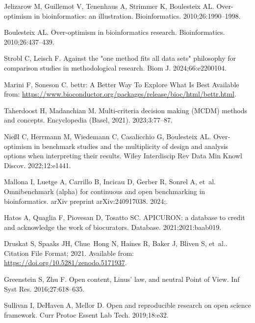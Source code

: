 \documentclass[11pt]{article}
\begin{document}
\begin{thebibliography}{10}
Jelizarow M, Guillemot V, Tenenhaus A, Strimmer K, Boulesteix AL.
\newblock Over-optimism in bioinformatics: an illustration.
\newblock Bioinformatics. 2010;26:1990--1998.

Boulesteix AL.
\newblock Over-optimism in bioinformatics research.
\newblock Bioinformatics. 2010;26:437--439.

Strobl C, Leisch F.
\newblock Against the "one method fits all data sets" philosophy for comparison
  studies in methodological research.
\newblock Biom J. 2024;66:e2200104.

Marini F, Soneson C. 
\newblock bettr: A Better Way To Explore What Is Best
\newblock Available from: \url{https://www.bioconductor.org/packages/release/bioc/html/bettr.html}.

Taherdoost H, Madanchian M.
\newblock Multi-criteria decision making ({MCDM}) methods and concepts.
\newblock Encyclopedia (Basel, 2021). 2023;3:77--87.

Nießl C, Herrmann M, Wiedemann C, Casalicchio G, Boulesteix AL.
\newblock Over‐optimism in benchmark studies and the multiplicity of design
  and analysis options when interpreting their results.
\newblock Wiley Interdiscip Rev Data Min Knowl Discov. 2022;12:e1441.

Mallona I, Luetge A, Carrillo B, Incicau D, Gerber R, Sonrel A, et~al.
\newblock Omnibenchmark (alpha) for continuous and open benchmarking in
  bioinformatics.
\newblock arXiv preprint arXiv:240917038. 2024;.

Hatos A, Quaglia F, Piovesan D, Tosatto SC.
\newblock APICURON: a database to credit and acknowledge the work of
  biocurators.
\newblock Database. 2021;2021:baab019.

Druskat S, Spaaks JH, Chue~Hong N, Haines R, Baker J, Bliven S, et~al..
  Citation File Format; 2021.
\newblock Available from: \url{https://doi.org/10.5281/zenodo.5171937}.

Greenstein S, Zhu F.
\newblock Open content, Linus’ law, and neutral Point of View.
\newblock Inf Syst Res. 2016;27:618--635.

Sullivan I, DeHaven A, Mellor D.
\newblock Open and reproducible research on open science framework.
\newblock Curr Protoc Essent Lab Tech. 2019;18:e32.


\end{thebibliography}
\end{document}
